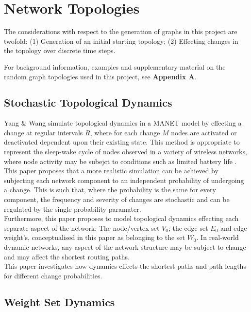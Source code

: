 \documentclass[
	a4paper, %
	10pt, %
	unnumberedsections, %
	twoside, %
]{LTJournalArticle}
\begin{document}
\section{Network Topologies} 

The considerations with respect to the generation of graphs in this project are twofold: (1) Generation of an initial starting topology; (2) Effecting changes in the topology over discrete time steps. 

For background information, examples and supplementary material on the random graph topologies used in this project, see \textbf{Appendix A}. 

\subsection{Stochastic Topological Dynamics}

Yang \& Wang simulate topological dynamics in a MANET model by effecting a change at regular intervals \(R\), where for each change \(M\) nodes are activated or deactivated dependent upon their existing state. This method is appropriate to represent the sleep-wake cycle of nodes observed in a variety of wireless networks, where node activity may be subejct to conditions such as limited battery life \cite{yang:10}. \\

This paper proposes that a more realistic simulation can be achieved by subjecting each network component to an independent probability of undergoing a change. This is such that, where the probability is the same for every component, the frequency and severity of changes are stochastic and can be regulated by the single probability paramater. \\

Furthermore, this paper proposes to model topological dynamics effecting each separate aspect of the network: The node/vertex set \(V_{0}\); the edge set \(E_{0}\) and edge weight's, conceptualised in this paper as belonging to the set \(W_{0}\). In real-world dynamic networks, any aspect of the network structure may be subject to change and may affect the shortest routing paths. \\ 

This paper investigates how dynamics effects the shortest paths and path lengths for different change probabilities.  \\

\subsection{Weight Set Dynamics}
\end{document}
